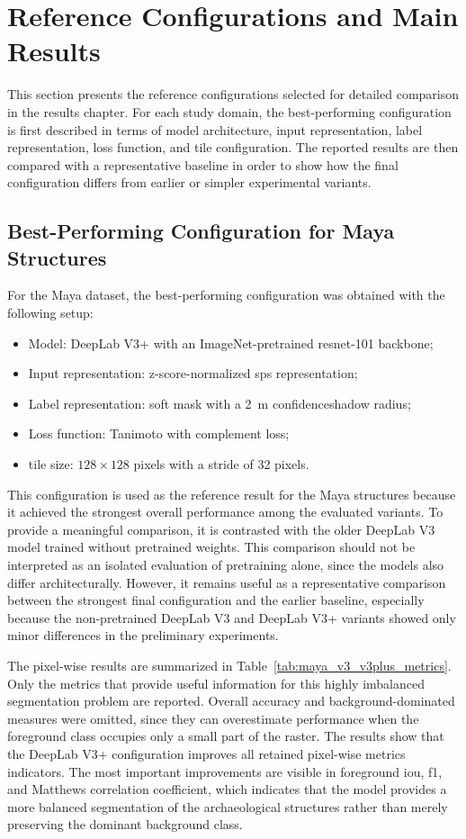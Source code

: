 \section{Reference Configurations and Main Results}

This section presents the reference configurations selected for detailed comparison in the results chapter. For each study domain, the best-performing configuration is first described in terms of model architecture, input representation, label representation, loss function, and tile configuration. The reported results are then compared with a representative baseline in order to show how the final configuration differs from earlier or simpler experimental variants.

\subsection{Best-Performing Configuration for Maya Structures}

For the Maya dataset, the best-performing configuration was obtained with the following setup:
\begin{itemize}
    \item Model: DeepLab V3+ with an ImageNet-pretrained \gls{resnet}-101 backbone;
    \item Input representation: z-score-normalized \gls{sps} representation;
    \item Label representation: soft mask with a 2~m \gls{confidenceshadow} radius;
    \item Loss function: Tanimoto with complement loss;
    \item tile size: $128 \times 128$ pixels with a stride of 32 pixels.
\end{itemize}

This configuration is used as the reference result for the Maya structures because it achieved the strongest overall performance among the evaluated variants. To provide a meaningful comparison, it is contrasted with the older DeepLab V3 model trained without pretrained weights. This comparison should not be interpreted as an isolated evaluation of pretraining alone, since the models also differ architecturally. However, it remains useful as a representative comparison between the strongest final configuration and the earlier baseline, especially because the non-pretrained DeepLab V3 and DeepLab V3+ variants showed only minor differences in the preliminary experiments.

The pixel-wise results are summarized in Table~\ref{tab:maya_v3_v3plus_metrics}. Only the metrics that provide useful information for this highly imbalanced segmentation problem are reported. Overall accuracy and background-dominated measures were omitted, since they can overestimate performance when the foreground class occupies only a small part of the raster. The results show that the DeepLab V3+ configuration improves all retained pixel-wise metrics indicators. The most important improvements are visible in foreground \gls{iou}, \gls{f1}, and Matthews correlation coefficient, which indicates that the model provides a more balanced segmentation of the archaeological structures rather than merely preserving the dominant background class.

